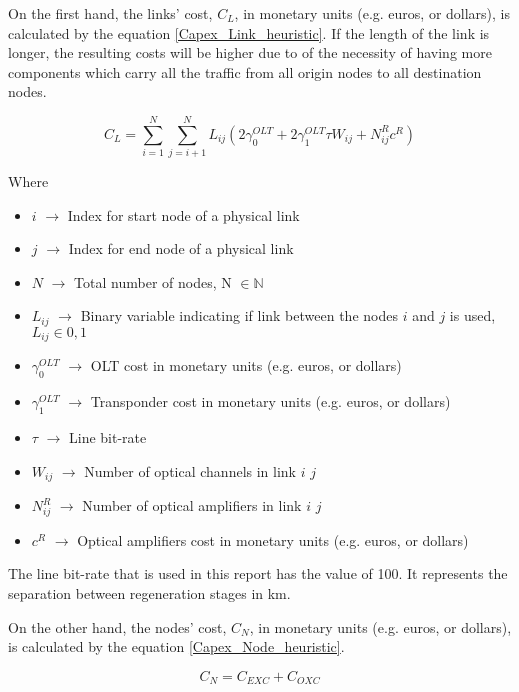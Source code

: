 On the first hand, the links' cost, $C_L$, in monetary units (e.g. euros, or dollars), is calculated by the equation \ref{Capex_Link_heuristic}. If the length of the link is longer, the resulting costs will be higher due to of the necessity of having more components which carry all the traffic from all origin nodes to all destination nodes.

\begin{equation}
C_L = \sum_{i=1}^N \sum_{j=i+1}^N L_{ij} \left( 2 \gamma_0^{OLT} + 2 \gamma_1^{OLT} \tau W_{ij} + N^R_{ij} c^R \right)
\label{Capex_Link_heuristic}
\end{equation}

Where

\begin{itemize}
\item{$i$               $\rightarrow$   Index for start node of a physical link}
\item{$j$               $\rightarrow$   Index for end node of a physical link}
\item{$N$				$\rightarrow$	Total number of nodes, N $\in \mathbb{N}$}
\item{$L_{ij}$			$\rightarrow$	Binary variable indicating if link between the nodes $i$ and $j$ is used, $L_{ij} \in {0, 1}$}
\item{$\gamma_0^{OLT}$	$\rightarrow$	OLT cost in monetary units (e.g. euros, or dollars)}
\item{$\gamma_1^{OLT}$	$\rightarrow$	Transponder cost in monetary units (e.g. euros, or dollars)}
\item{$\tau$		    $\rightarrow$	Line bit-rate}
\item{$W_{ij}$          $\rightarrow$   Number of optical channels in link $i$ $j$}
\item{$N^R_{ij}$    	$\rightarrow$	Number of optical amplifiers in link $i$ $j$}
\item{$c^R$				$\rightarrow$	Optical amplifiers cost in monetary units (e.g. euros, or dollars)}
\end{itemize}

The line bit-rate that is used in this report has the value of 100. It represents the separation between regeneration stages in km.

On the other hand, the nodes' cost, $C_N$, in monetary units (e.g. euros, or dollars), is calculated by the equation \ref{Capex_Node_heuristic}.

\begin{equation}
C_N = C_{EXC} + C_{OXC}
\label{Capex_Node_heuristic}
\end{equation}

